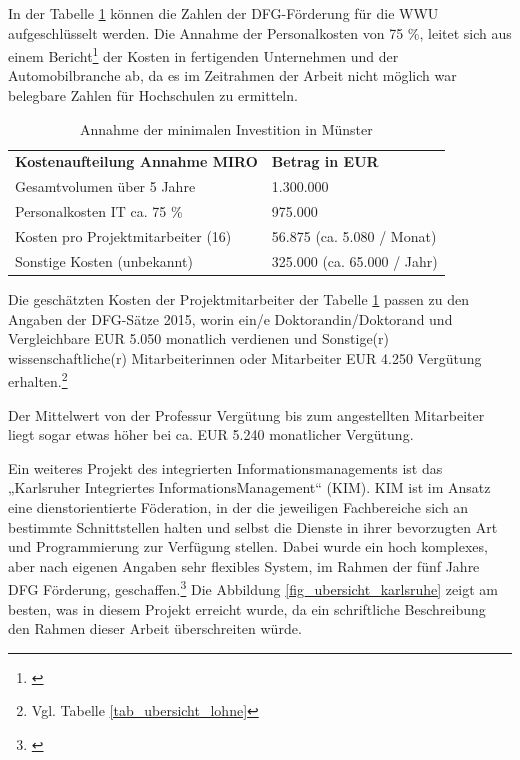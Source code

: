 
In der Tabelle \ref{tab_minimale_investition_munster} können die Zahlen der DFG-Förderung für die WWU aufgeschlüsselt werden.
Die Annahme der Personalkosten von 75 \%, leitet sich aus einem Bericht\footnote{\autocite{schuelein_2009}} der Kosten in fertigenden Unternehmen und der Automobilbranche ab, da es im Zeitrahmen der Arbeit nicht möglich war belegbare Zahlen für Hochschulen zu ermitteln. 

\begin{table}[h!]
	\begin{tabularx}{\textwidth}{l|l}
		\hline
		\textbf{Kostenaufteilung Annahme MIRO} & \textbf{Betrag in EUR}\\
		Gesamtvolumen über 5 Jahre & 1.300.000\\
		Personalkosten IT ca. 75 \% & 975.000\\
		Kosten pro Projektmitarbeiter (16) & 56.875 (ca. 5.080 / Monat)\\ 
		Sonstige Kosten (unbekannt) & 325.000 (ca. 65.000 / Jahr)\\
		\hline
    \end{tabularx}
    \caption{Annahme der minimalen Investition in Münster}
    \label{tab_minimale_investition_munster}
\end{table}

Die geschätzten Kosten der Projektmitarbeiter der Tabelle \ref{tab_minimale_investition_munster} passen zu den Angaben der DFG-Sätze 2015, worin ein/e Doktorandin/Doktorand und Vergleichbare EUR 5.050 monatlich verdienen und Sonstige(r) wissenschaftliche(r) Mitarbeiterinnen oder Mitarbeiter EUR 4.250 Vergütung erhalten.\footnote{Vgl. Tabelle \ref{tab_ubersicht_lohne}} 

\clearpage

Der Mittelwert von der Professur Vergütung bis zum angestellten Mitarbeiter liegt sogar etwas höher bei ca. EUR 5.240 monatlicher Vergütung.

Ein weiteres Projekt des integrierten Informationsmanagements ist das „Karlsruher Integriertes InformationsManagement“ (KIM).
KIM ist im Ansatz eine dienstorientierte Föderation, in der die jeweiligen Fachbereiche sich an bestimmte Schnittstellen 
halten und selbst die Dienste in ihrer bevorzugten Art und Programmierung zur Verfügung stellen. Dabei wurde ein hoch komplexes, aber nach eigenen Angaben sehr flexibles System, im Rahmen der fünf Jahre DFG Förderung, geschaffen.\footnote{\cite{bode_informationsmanagement_2010}}
Die Abbildung \ref{fig_ubersicht_karlsruhe} zeigt am besten, was in diesem Projekt erreicht wurde, da ein schriftliche Beschreibung den Rahmen dieser Arbeit überschreiten würde.

